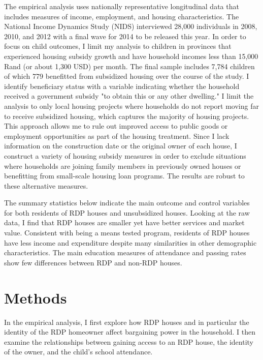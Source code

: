 \documentclass[11pt]{article} %
\begin{document}
The empirical analysis uses nationally representative longitudinal data that includes measures of income, employment, and housing characteristics.  The National Income Dynamics Study (NIDS) interviewed 28,000 individuals in 2008, 2010, and 2012 with a final wave for 2014 to be released this year.  In order to focus on child outcomes, I limit my analysis to children in provinces that experienced housing subsidy growth and have household incomes less than 15,000 Rand (or about 1,300 USD) per month.  The final sample includes 7,784 children of which 779 benefitted from subsidized housing over the course of the study.  I identify beneficiary status with a variable indicating whether the household received a government subsidy "to obtain this or any other dwelling."  I limit the analysis to only local housing projects where households do not report moving far to receive subsidized housing, which captures the majority of housing projects.  This approach allows me to rule out improved access to public goods or employment opportunities as part of the housing treatment.  Since I lack information on the construction date or the original owner of each house, I construct a variety of housing subsidy measures in order to exclude situations where households are joining family members in previously owned houses or benefitting from small-scale housing loan programs.  The results are robust to these alternative measures.

The summary statistics below indicate the main outcome and control variables for both residents of RDP houses and unsubsidized houses.  Looking at the raw data, I find that RDP houses are smaller yet have better services and market value.  Consistent with being a means tested program, residents of RDP houses have less income and expenditure despite many similarities in other demographic characteristics.  The main education measures of attendance and passing rates show few differences between RDP and non-RDP houses.

\begin{center}
	
\end {center}

\section*{Methods}

In the empirical analysis, I first explore how RDP houses and in particular the identity of the RDP homeowner affect bargaining power in the household.  I then examine the relationships between gaining access to an RDP house, the identity of the owner, and the child's school attendance.  
\end{document}
